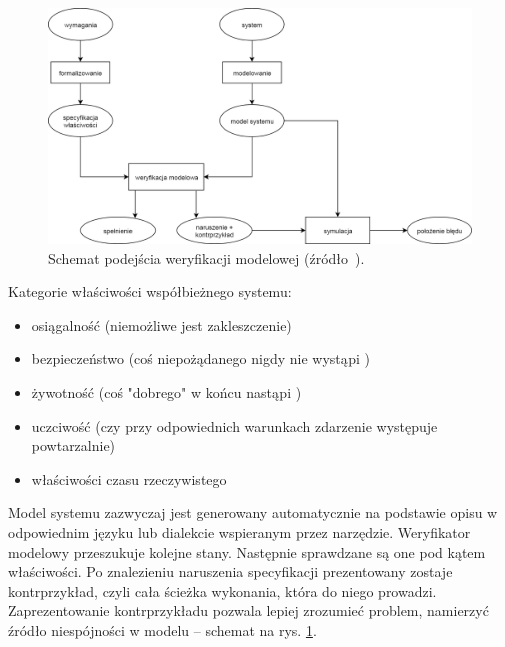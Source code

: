 \vspace{0.5cm}
\begin{figure}[h]
    \centering
    \includegraphics[width=\textwidth,keepaspectratio]{img/model_checking_approach_schematic_view.png}
    \caption{Schemat podejścia weryfikacji modelowej (źródło~\cite{Bai08}).}
    \label{fig:model_checking_scheme}
\end{figure}

\noindent
Kategorie właściwości współbieżnego systemu:
\begin{itemize}
\item osiągalność (niemożliwe jest zakleszczenie)
\item bezpieczeństwo (coś niepożądanego nigdy nie wystąpi \cite{Alp87})
\item żywotność (coś "dobrego" w końcu nastąpi \cite{Alp85})
\item uczciwość (czy przy odpowiednich warunkach zdarzenie występuje powtarzalnie)
\item właściwości czasu rzeczywistego
\end{itemize}

\vspace{0.5cm}
Model systemu zazwyczaj jest generowany automatycznie na podstawie opisu w odpowiednim języku lub dialekcie wspieranym przez narzędzie. 
Weryfikator modelowy przeszukuje kolejne stany.
Następnie sprawdzane są one pod kątem właściwości.
Po znalezieniu naruszenia specyfikacji prezentowany zostaje kontrprzykład, czyli cała ścieżka wykonania, która do niego prowadzi.
Zaprezentowanie kontrprzykładu pozwala lepiej zrozumieć problem, namierzyć źródło niespójności w modelu -- schemat na rys. \ref{fig:model_checking_scheme}.

